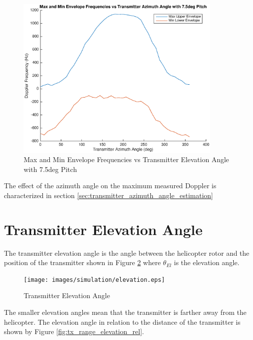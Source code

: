 \begin{figure}
	\begin{center}
		\includegraphics[width=10cm]{images/simulation/pitch_azimuth_rev.eps}
		\caption{Max and Min Envelope Frequencies vs Transmitter Elevation Angle with 7.5deg Pitch}
		\label{fig:pitch_azimuth_rev}
	\end{center}
\end{figure}

The effect of the azimuth angle on the maximum measured Doppler is characterized in section \ref{sec:transmitter_azimuth_angle_estimation}

\section{Transmitter Elevation Angle} \label{sec:tea}
The transmitter elevation angle is the angle between the helicopter rotor and the position of the transmitter shown in Figure \ref{fig:azimuth_rel} where $\theta_{El}$ is the elevation angle. 

\begin{figure}
	\begin{center}
		\texttt{[image: images/simulation/elevation.eps]}
		\caption{Transmitter Elevation Angle}
		\label{fig:azimuth_rel}
	\end{center}
\end{figure}

The smaller elevation angles mean that the transmitter is farther away from the helicopter. The elevation angle in relation to the distance of the transmitter is shown by Figure \ref{fig:tx_range_elevation_rel}.

